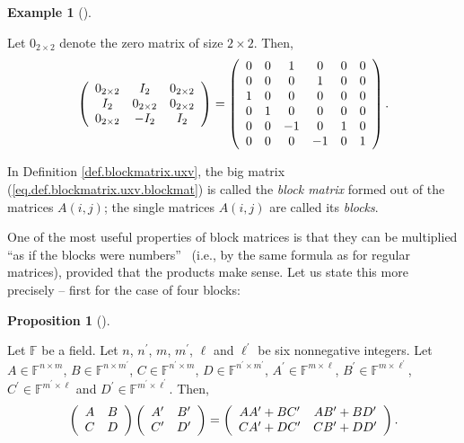 \documentclass[numbers=enddot,12pt,final,onecolumn,notitlepage]{scrartcl}%
\numberwithin{exer}{subsection}
\theoremstyle{definition}
\newtheorem{prop}[theo]{Proposition}
\newenvironment{proposition}[1][]
{\begin{prop}[#1]\begin{leftbar}}
{\end{leftbar}\end{prop}}
\newtheorem{exam}[theo]{Example}
\newenvironment{example}[1][]
{\begin{exam}[#1]\begin{leftbar}}
{\end{leftbar}\end{exam}}
\begin{document}
\begin{example}
Let $0_{2\times2}$ denote the zero matrix of size $2\times2$. Then,%
\[
\left(
\begin{array}
[c]{ccc}%
0_{2\times2} & I_{2} & 0_{2\times2}\\
I_{2} & 0_{2\times2} & 0_{2\times2}\\
0_{2\times2} & -I_{2} & I_{2}%
\end{array}
\right)  =\left(
\begin{array}
[c]{cccccc}%
0 & 0 & 1 & 0 & 0 & 0\\
0 & 0 & 0 & 1 & 0 & 0\\
1 & 0 & 0 & 0 & 0 & 0\\
0 & 1 & 0 & 0 & 0 & 0\\
0 & 0 & -1 & 0 & 1 & 0\\
0 & 0 & 0 & -1 & 0 & 1
\end{array}
\right)  .
\]

\end{example}

In Definition \ref{def.blockmatrix.uxv}, the big matrix
(\ref{eq.def.blockmatrix.uxv.blockmat}) is called the \emph{block matrix}
formed out of the matrices $A\left(  i,j\right)  $; the single matrices
$A\left(  i,j\right)  $ are called its \emph{blocks}. \medskip

One of the most useful properties of block matrices is that they can be
multiplied \textquotedblleft as if the blocks were numbers\textquotedblright%
\ (i.e., by the same formula as for regular matrices), provided that the
products make sense. Let us state this more precisely -- first for the case of
four blocks:

\begin{proposition}
\label{prop.blockmatrix.mult-2x2}Let $\mathbb{F}$ be a field. Let $n$,
$n^{\prime}$, $m$, $m^{\prime}$, $\ell$ and $\ell^{\prime}$ be six nonnegative
integers. Let $A\in\mathbb{F}^{n\times m}$, $B\in\mathbb{F}^{n\times
m^{\prime}}$, $C\in\mathbb{F}^{n^{\prime}\times m}$, $D\in\mathbb{F}%
^{n^{\prime}\times m^{\prime}}$, $A^{\prime}\in\mathbb{F}^{m\times\ell}$,
$B^{\prime}\in\mathbb{F}^{m\times\ell^{\prime}}$, $C^{\prime}\in
\mathbb{F}^{m^{\prime}\times\ell}$ and $D^{\prime}\in\mathbb{F}^{m^{\prime
}\times\ell^{\prime}}$. Then,
\[
\left(
\begin{array}
[c]{cc}%
A & B\\
C & D
\end{array}
\right)  \left(
\begin{array}
[c]{cc}%
A^{\prime} & B^{\prime}\\
C^{\prime} & D^{\prime}%
\end{array}
\right)  =\left(
\begin{array}
[c]{cc}%
AA^{\prime}+BC^{\prime} & AB^{\prime}+BD^{\prime}\\
CA^{\prime}+DC^{\prime} & CB^{\prime}+DD^{\prime}%
\end{array}
\right)  .
\]

\end{proposition}
\end{document}
